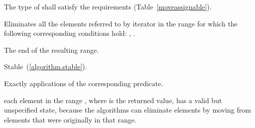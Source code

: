 \begin{itemdescr}
\begin{removedblock}
\pnum
\requires
The type of
shall satisfy the 
requirements (Table~\ref{moveassignable}).
\end{removedblock}

\pnum
\effects
Eliminates all the elements referred to by iterator
in the range 
for which the following corresponding conditions hold:
,
.

\pnum
\returns
The end of the resulting range.

\pnum
\remarks Stable~(\ref{algorithm.stable}).

\pnum
\complexity
Exactly
applications of the corresponding predicate.

\pnum
\realnote each element in the range , where  is
the returned value, has a valid but unspecified state, because the algorithms
can eliminate elements by moving from elements that were originally
in that range.
\end{itemdescr}

